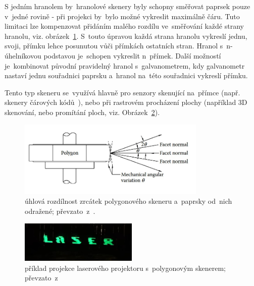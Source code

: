 
%

S jedním hranolem by~hranolové skenery byly schopny směřovat paprsek pouze v~jedné rovině - při projekci by~bylo možné vykreslit maximálně čáru. Tuto limitaci lze kompenzovat přidáním malého rozdílu ve~směřování každé strany hranolu, viz. obrázek~\ref{fig:polygon-angular-variation}. S~touto úpravou každá strana hranolu vykreslí jednu, svoji, přímku lehce posunutou vůči přímkách ostatních stran. Hranol s~n-úhelníkovou podstavou je~schopen vykreslit n~přímek.
Další možností je~kombinovat původní pravidelný hranol s~galvanometrem, kdy galvanometr nastaví jednu souřadnici paprsku a~hranol na~této souřadnici vykreslí přímku.

Tento typ skeneru se~využívá hlavně pro senzory skenující na~přímce (např. skenery čárových kódů~\cite{history-of-barcode-scanning}), nebo při rastrovém procházení plochy (například 3D skenování, nebo promítání ploch, viz. Obrázek~\ref{fig:harddrive-projection}).

\begin{figure}[htb]
  \centering
  \includegraphics[width=0.8\textwidth]{img/polygon-angular-variation.jpg}
  \caption{\label{fig:polygon-angular-variation} úhlová rozdílnost zrcátek polygonového skeneru a~paprsky od~nich odražené; převzato~z~\cite{scanning-handbook}.}
\end{figure}


\begin{figure}[htb]
  \centering
  \includegraphics[width=0.5\textwidth]{img/harddrive-projection.jpg}
  \caption{\label{fig:harddrive-projection} příklad projekce laserového projektoru s~polygonovým skenerem; převzato~z~\cite{harddrive-projector-youtube}}
\end{figure}

